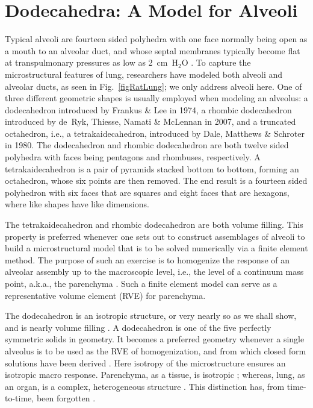 \part{Dodecahedra: A Model for Alveoli}
\label{partDodecahedron}

Typical alveoli are fourteen sided polyhedra with one face normally being open as a mouth to an alveolar duct, and whose septal membranes typically become flat at trans\-pulmonary pressures as low as 2~cm~$\text{H}_2\text{O}$ \cite{HoppinHildebrandt77}.  To capture the micro\-structural features of lung, researchers have modeled both alveoli and alveolar ducts, as seen in Fig.~\ref{figRatLung}; we only address alveoli here.  One of three different geometric shapes is usually employed when modeling an alveolus: a dodecahedron introduced by Frankus \& Lee \cite{FrankusLee74} in 1974, a rhombic dodecahedron introduced by de~Ryk, Thiesse, Namati \& McLennan \cite{Ryketal07} in 2007, and a truncated octahedron, i.e., a tetrakaidecahedron, introduced by Dale, Matthews \& Schroter \cite{Daleetal80} in 1980.  The dodecahedron and rhombic dodecahedron are both twelve sided polyhedra with faces being pentagons and rhombuses, respectively.  A tetrakaidecahedron is a pair of pyramids stacked bottom to bottom, forming an octahedron, whose six points are then removed.  The end result is a fourteen sided polyhedron with six faces that are squares and eight faces that are hexagons, where like shapes have like dimensions.

The tetrakaidecahedron and rhombic dodecahedron are both volume filling.  This property is preferred whenever one sets out to construct assemblages of alveoli to build a micro\-structural model that is to be solved numerically via a finite element method.  The purpose of such an exercise is to homogenize the response of an alveolar assembly up to the macroscopic level, i.e., the level of a continuum mass point, a.k.a., the parenchyma \cite{Daleetal80,DennySchroter95,DennySchroter97,DennySchroter00,Koweetal86,Ryketal07,Chenetal14}.  Such a finite element model can serve as a representative volume element (RVE) for parenchyma.

The dodecahedron is an isotropic structure, or very nearly so as we shall show, and is nearly volume filling \cite{Kimmeletal87}.  A dodecahedron is one of the five perfectly symmetric solids in geometry.  It becomes a preferred geometry whenever a single alveolus is to be used as the RVE of homo\-genization, and from which closed form solutions have been derived \cite{BudianskyKimmel87,KimmelBudiansky90,Kimmeletal87,Freedetal12}.  Here isotropy of the microstructure ensures an isotropic macro response.  Parenchyma, as a tissue, is isotropic \cite{Weedetal15,Fung88,Hughesetal72}; whereas, lung, as an organ, is a complex, heterogeneous structure \cite{Mead73,West07}.  This distinction has, from time-to-time, been forgotten \cite{DennySchroter06}.  


